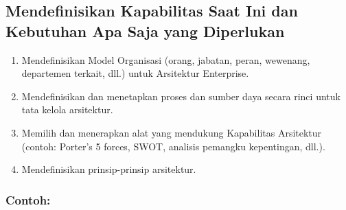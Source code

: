 \subsection{Mendefinisikan Kapabilitas Saat Ini dan Kebutuhan Apa Saja yang Diperlukan}
\begin{enumerate}
	\item Mendefinisikan Model Organisasi (orang, jabatan, peran, wewenang, departemen terkait, dll.) untuk Arsitektur Enterprise.
	\item Mendefinisikan dan menetapkan proses dan sumber daya secara rinci untuk tata kelola arsitektur.
	\item Memilih dan menerapkan alat yang mendukung Kapabilitas Arsitektur (contoh: Porter’s 5 forces, SWOT, analisis pemangku kepentingan, dll.).
	\item Mendefinisikan prinsip-prinsip arsitektur.
\end{enumerate}

\subsubsection{Contoh:}

